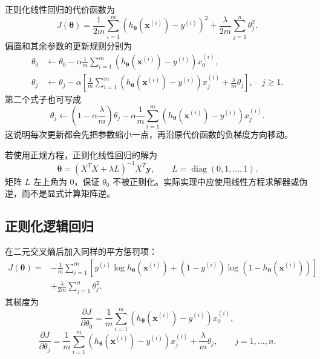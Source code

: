\documentclass[12pt,a4paper]{ctexart}
\begin{document}
\begin{definitionbox}[代价函数与梯度下降]
正则化线性回归的代价函数为
\[
  J(\boldsymbol{\theta})
  =\frac{1}{2m}\sum_{i=1}^{m}
  \left(h_{\boldsymbol{\theta}}\!\left(\mathbf{x}^{(i)}\right)-y^{(i)}\right)^2
  +\frac{\lambda}{2m}\sum_{j=1}^{n}\theta_j^2.
\]
偏置和其余参数的更新规则分别为
\begin{align*}
  \theta_0&\leftarrow\theta_0
  -\alpha\frac{1}{m}\sum_{i=1}^{m}
  \left(h_{\boldsymbol{\theta}}\!\left(\mathbf{x}^{(i)}\right)-y^{(i)}\right)x_0^{(i)},\\
  \theta_j&\leftarrow\theta_j
  -\alpha\left[
    \frac{1}{m}\sum_{i=1}^{m}
    \left(h_{\boldsymbol{\theta}}\!\left(\mathbf{x}^{(i)}\right)-y^{(i)}\right)x_j^{(i)}
    +\frac{\lambda}{m}\theta_j
  \right],\quad j\geq1.
\end{align*}
第二个式子也可写成
\[
  \theta_j\leftarrow
  \left(1-\alpha\frac{\lambda}{m}\right)\theta_j
  -\alpha\frac{1}{m}\sum_{i=1}^{m}
  \left(h_{\boldsymbol{\theta}}\!\left(\mathbf{x}^{(i)}\right)-y^{(i)}\right)x_j^{(i)}.
\]
这说明每次更新都会先把参数缩小一点，再沿原代价函数的负梯度方向移动。
\end{definitionbox}

\begin{tipbox}[正则化正规方程]
若使用正规方程，正则化线性回归的解为
\[
  \boldsymbol{\theta}
  =\left(X^TX+\lambda L\right)^{-1}X^T\mathbf{y},
  \qquad
  L=\operatorname{diag}(0,1,\ldots,1).
\]
矩阵 $L$ 左上角为 $0$，保证 $\theta_0$ 不被正则化。实际实现中应使用线性方程求解器或伪逆，而不是显式计算矩阵逆。
\end{tipbox}

\subsection{正则化逻辑回归}

\begin{definitionbox}[正则化逻辑回归的代价函数]
在二元交叉熵后加入同样的平方惩罚项：
\begin{align*}
  J(\boldsymbol{\theta})
  ={}&-\frac{1}{m}\sum_{i=1}^{m}
  \left[
    y^{(i)}\log h_{\boldsymbol{\theta}}\!\left(\mathbf{x}^{(i)}\right)
    +(1-y^{(i)})\log\!\left(1-h_{\boldsymbol{\theta}}\!\left(\mathbf{x}^{(i)}\right)\right)
  \right]\\
  &+\frac{\lambda}{2m}\sum_{j=1}^{n}\theta_j^2.
\end{align*}
其梯度为
\[
  \frac{\partial J}{\partial\theta_0}
  =\frac{1}{m}\sum_{i=1}^{m}
  \left(h_{\boldsymbol{\theta}}\!\left(\mathbf{x}^{(i)}\right)-y^{(i)}\right)x_0^{(i)},
\]
\[
  \frac{\partial J}{\partial\theta_j}
  =\frac{1}{m}\sum_{i=1}^{m}
  \left(h_{\boldsymbol{\theta}}\!\left(\mathbf{x}^{(i)}\right)-y^{(i)}\right)x_j^{(i)}
  +\frac{\lambda}{m}\theta_j,
  \qquad j=1,\ldots,n.
\]
\end{definitionbox}
\end{document}
